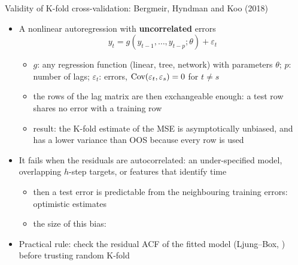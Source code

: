 \begin{frame}{Validity of K-fold cross-validation: Bergmeir, Hyndman and Koo (2018)}
\itemsize{\small}
\begin{itemize}
    \item A nonlinear autoregression with \textbf{uncorrelated} errors 
    \[ y_t = g(y_{t-1},\dots,y_{t-p}; \theta) + \varepsilon_t \]
    \begin{itemize}
        \item $g$: any regression function (linear, tree, network) with parameters $\theta$; $p$: number of lags; $\varepsilon_t$: errors, $\text{Cov}(\varepsilon_t, \varepsilon_s) = 0$ for $t \ne s$
        \item the rows of the lag matrix are then exchangeable enough: a test row shares no error with a training row
        \item result: the K-fold estimate of the MSE is asymptotically unbiased, and has a lower variance than OOS because every row is used
    \end{itemize}
    \item It fails when the residuals are autocorrelated: an under-specified model, overlapping $h$-step targets, or features that identify time
    \begin{itemize}
        \item then a test error is predictable from the neighbouring training errors: optimistic estimates
        \item the size of this bias:   %
    \end{itemize}
    \item Practical rule: check the residual ACF of the fitted model (Ljung--Box, ) before trusting random K-fold
\end{itemize}
\end{frame}

